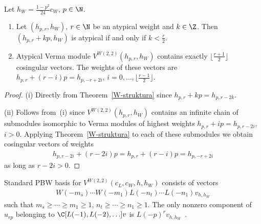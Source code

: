 \begin{Proposition} \label{svi cosing}
Let $h_W=\frac{1-p^2}{24}c_W$, $p\in\N$.
\begin{enumerate}\itemsep=0pt
\item[$(i)$]Let $(h_{p,r},h_W)$, $r\in\N$ be an atypical weight and $k\in\Z$. Then $(h_{p,r}+kp,h_W)$ is atypical if and only if $k<\frac{r}{2}$.
\item[$(ii)$]Atypical Verma module $V^{W(2,2)}(h_{p,r},h_W)$ contains exactly $\lfloor \frac{r+1}{2} \rfloor$ cosingular vectors. The weights of these vectors are $h_{p,r}+(r-i)p = h_{p,-r+2i}$, $i=0,\ldots,\lfloor \frac{r-1}{2} \rfloor$.
\end{enumerate}
\end{Proposition}

\begin{proof}
(i) Directly from Theorem~\ref{W-struktura} since $h_{p,r}+kp = h_{p,r-2k}$.

(ii) Follows from~(i) since $V^{W(2,2)}(h_{p,r},h_W)$ contains an inf\/inite chain of submodules isomorphic to Verma modules of highest weights $h_{p,r}+ip = h_{p,r-2i}$, $i>0$. Applying Theorem~\ref{W-struktura} to each of these submodules we obtain cosingular vectors of weights
\begin{gather*}
h_{p,r-2i}+(r-2i)p = h_{p,r}+(r-i)p = h_{p,-r+2i}
\end{gather*}
as long as $r-2i>0$.
\end{proof}

\begin{Remark}\label{pbw}
Standard PBW basis for $V^{W(2,2)}(c_{L},c_{W},h,h_{W}) $ consists of vectors
\begin{gather*}
W(-m_{s}) \cdots W(-m_{1}) L(-n_{t}) \cdots L ( -n_{1} ) v_{h,h_W}
\end{gather*}
such that $ m_{s}\geq\cdots\geq m_{1}\geq1$, $n_{t}\geq\cdots\geq n_{1}\geq1 $. The only nonzero component of $u_{rp}$ belonging to $\C [ L(-1) ,L ( -2), \ldots ] v$ is $L(-p)^{r}v_{h,h_W}$~\cite{R-JMP}.
\end{Remark}

